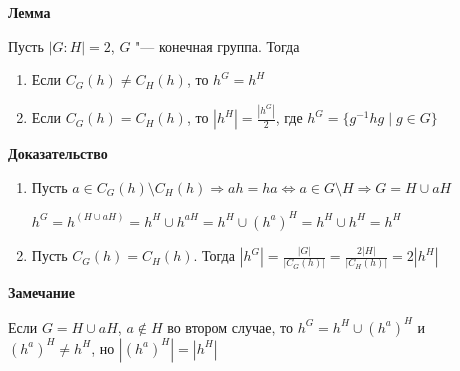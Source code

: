 \documentclass{article}
\begin{document}
\vspace{10pt}

\textbf{Лемма}

Пусть $|G:H| = 2$, $G$ "--- конечная группа. Тогда
\begin{enumerate}
	\item Если $C_G(h) \neq C_H(h)$, то $h^G = h^H$
	\item Если $C_G(h) = C_H(h)$, то $|h^H| = \frac{|h^G|}{2}$, где $h^G = \{g^{-1}hg \mid g \in G\}$
\end{enumerate}

\textbf{Доказательство}
\begin{enumerate}
	\item Пусть $a \in C_G(h) \setminus C_H(h) \Rightarrow ah = ha \Leftrightarrow a \in G \setminus H \Rightarrow G = H \cup aH$
	
	$h^G = h^{(H \cup aH)} = h^H \cup h^{aH} = h^H \cup (h^a)^H = h^H \cup h^H = h^H$
	
	\item Пусть $C_G(h) = C_H(h)$. Тогда $|h^G| = \frac{|G|}{|C_G(h)|} = \frac{2|H|}{|C_H(h)|} = 2|h^H|$

\end{enumerate}

\vspace{10pt}

\textbf{Замечание}

Если $G = H \cup aH$, $a \notin H$ во втором случае, то $h^G = h^H \cup (h^a)^H$ и $(h^a)^H \neq h^H$, но $|(h^a)^H| = |h^H|$
\end{document}

